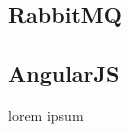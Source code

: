 \documentclass[brudnopis]{xmgr}
\begin{document}
\subsection{RabbitMQ}

\subsection{AngularJS}

\summary
lorem ipsum









\listoftables

\listoffigures

\oswiadczenie
\end{document}
